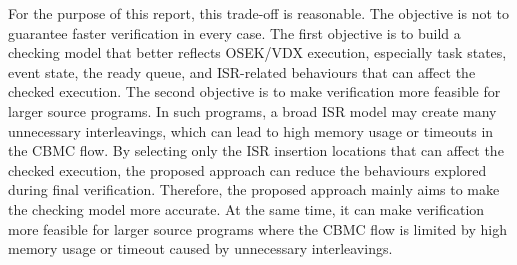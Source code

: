 For the purpose of this report, this trade-off is reasonable. The objective is not to guarantee faster verification in every case. The first objective is to build a checking model that better reflects OSEK/VDX execution, especially task states, event state, the ready queue, and ISR-related behaviours that can affect the checked execution. The second objective is to make verification more feasible for larger source programs. In such programs, a broad ISR model may create many unnecessary interleavings, which can lead to high memory usage or timeouts in the CBMC flow. By selecting only the ISR insertion locations that can affect the checked execution, the proposed approach can reduce the behaviours explored during final verification. Therefore, the proposed approach mainly aims to make the checking model more accurate. At the same time, it can make verification more feasible for larger source programs where the CBMC flow is limited by high memory usage or timeout caused by unnecessary interleavings.
